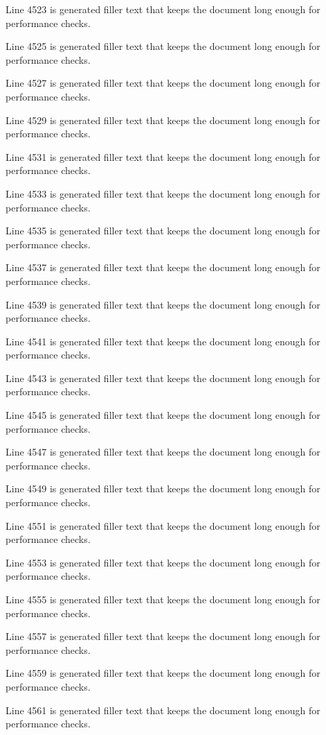 Line 4523 is generated filler text that keeps the document long enough for performance checks.

Line 4525 is generated filler text that keeps the document long enough for performance checks.

Line 4527 is generated filler text that keeps the document long enough for performance checks.

Line 4529 is generated filler text that keeps the document long enough for performance checks.

Line 4531 is generated filler text that keeps the document long enough for performance checks.

Line 4533 is generated filler text that keeps the document long enough for performance checks.

Line 4535 is generated filler text that keeps the document long enough for performance checks.

Line 4537 is generated filler text that keeps the document long enough for performance checks.

Line 4539 is generated filler text that keeps the document long enough for performance checks.

Line 4541 is generated filler text that keeps the document long enough for performance checks.

Line 4543 is generated filler text that keeps the document long enough for performance checks.

Line 4545 is generated filler text that keeps the document long enough for performance checks.

Line 4547 is generated filler text that keeps the document long enough for performance checks.

Line 4549 is generated filler text that keeps the document long enough for performance checks.

Line 4551 is generated filler text that keeps the document long enough for performance checks.

Line 4553 is generated filler text that keeps the document long enough for performance checks.

Line 4555 is generated filler text that keeps the document long enough for performance checks.

Line 4557 is generated filler text that keeps the document long enough for performance checks.

Line 4559 is generated filler text that keeps the document long enough for performance checks.

Line 4561 is generated filler text that keeps the document long enough for performance checks.

